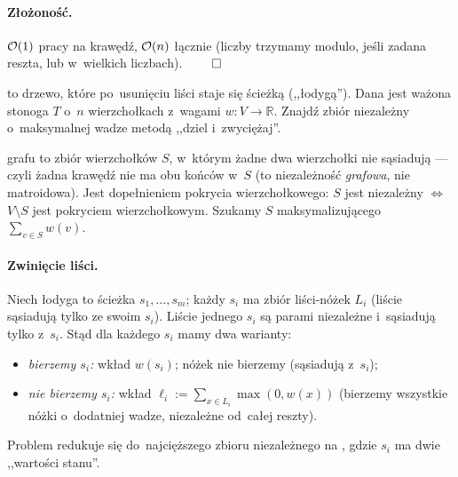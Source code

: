 \paragraph{Złożoność.}
$\mathcal{O}(1)$ pracy na krawędź, $\mathcal{O}(n)$ łącznie (liczby trzymamy modulo, jeśli
zadana reszta, lub w~wielkich liczbach). $\qed$

\clearpage
\begin{zadanie}
	 to drzewo, które po~usunięciu liści staje się ścieżką
	(,,łodygą''). Dana jest ważona stonoga $T$ o~$n$ wierzchołkach z~wagami
	$w\colon V\to\mathbb{R}$. Znajdź zbiór niezależny o~maksymalnej wadze metodą
	,,dziel i~zwyciężaj''.
\end{zadanie}

\begin{dygresja}
	 grafu to zbiór wierzchołków $S$, w~którym żadne
	dwa wierzchołki nie sąsiadują --- czyli żadna krawędź nie ma obu końców
	w~$S$ (to niezależność \emph{grafowa}, nie matroidowa). Jest dopełnieniem
	pokrycia wierzchołkowego: $S$ jest niezależny $\iff$ $V\setminus S$ jest
	pokryciem wierzchołkowym. Szukamy $S$ maksymalizującego $\sum_{v\in S}w(v)$.
\end{dygresja}

\paragraph{Zwinięcie liści.}
Niech łodyga to ścieżka $s_1,\dots,s_m$; każdy $s_i$ ma zbiór liści-nóżek
$L_i$ (liście sąsiadują tylko ze swoim $s_i$). Liście jednego $s_i$ są parami
niezależne i~sąsiadują tylko z~$s_i$. Stąd dla każdego $s_i$ mamy dwa warianty:
\begin{itemize}[nosep]
	\item \emph{bierzemy $s_i$:} wkład $w(s_i)$; nóżek nie bierzemy
	      (sąsiadują z~$s_i$);
	\item \emph{nie bierzemy $s_i$:} wkład $\ell_i:=\sum_{x\in L_i}\max(0,w(x))$
	      (bierzemy wszystkie nóżki o~dodatniej wadze, niezależne od~całej reszty).
\end{itemize}
Problem redukuje się do~najcięższego zbioru niezależnego na , gdzie
$s_i$ ma dwie ,,wartości stanu''.

